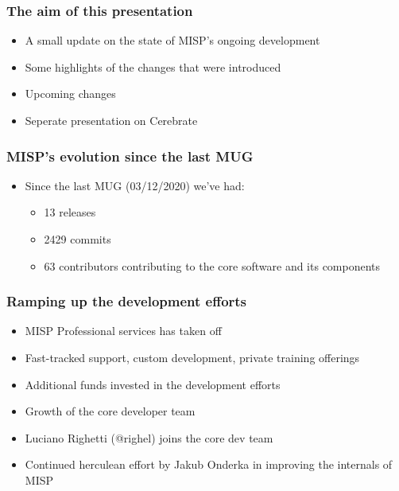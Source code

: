 
\begin{frame}
\titlepage
\end{frame}

\begin{frame}
  \frametitle{The aim of this presentation}
  \begin{itemize}
     \item A small update on the state of MISP's ongoing development
     \item Some highlights of the changes that were introduced
     \item Upcoming changes
     \item Seperate presentation on Cerebrate
  \end{itemize}
\end{frame}

\begin{frame}
  \frametitle{MISP's evolution since the last MUG}
  \begin{itemize}
    \item Since the last MUG (03/12/2020) we've had:
    \begin{itemize}
        \item 13 releases
        \item 2429 commits
        \item 63 contributors contributing to the core software and its components
    \end{itemize}
  \end{itemize}
\end{frame}

\begin{frame}
  \frametitle{Ramping up the development efforts}
  \begin{itemize}
      \item MISP Professional services has taken off
      \item Fast-tracked support, custom development, private training offerings
      \item Additional funds invested in the development efforts
      \item Growth of the core developer team
      \item Luciano Righetti (@righel) joins the core dev team
      \item Continued herculean effort by Jakub Onderka in improving the internals of MISP
  \end{itemize}
\end{frame}

